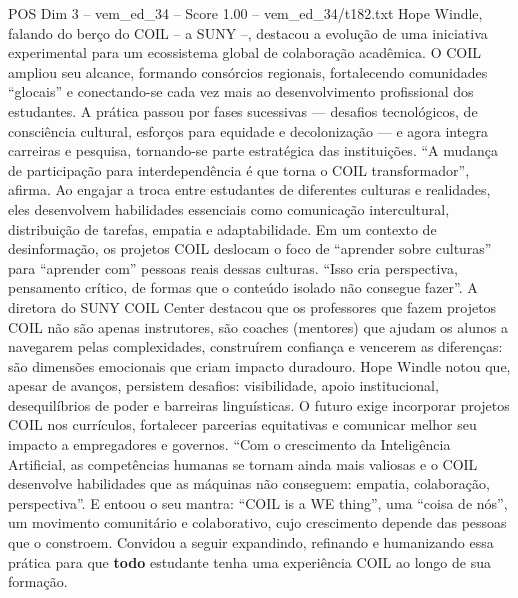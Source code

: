 \begin{textsample}{POS Dim 3 – vem\_ed\_34 – Score 1.00 – vem\_ed\_34/t182.txt}
Hope Windle, falando do berço do COIL – a SUNY –, destacou a evolução de uma iniciativa experimental para um ecossistema global de colaboração acadêmica.
O COIL ampliou seu alcance, formando consórcios regionais, fortalecendo comunidades “glocais” e conectando-se cada vez mais ao desenvolvimento profissional dos estudantes.
A prática passou por fases sucessivas — desafios tecnológicos, de consciência cultural, esforços para equidade e decolonização — e agora integra carreiras e pesquisa, tornando-se parte estratégica das instituições. “A mudança de participação para interdependência é que torna o COIL transformador”, afirma.
Ao engajar a troca entre estudantes de diferentes culturas e realidades, eles desenvolvem habilidades essenciais como comunicação intercultural, distribuição de tarefas, empatia e adaptabilidade.
Em um contexto de desinformação, os projetos COIL deslocam o foco de “aprender sobre culturas” para “aprender com” pessoas reais dessas culturas. “Isso cria perspectiva, pensamento crítico, de formas que o conteúdo isolado não consegue fazer”.
A diretora do SUNY COIL Center destacou que os professores que fazem projetos COIL não são apenas instrutores, são coaches (mentores) que ajudam os alunos a navegarem pelas complexidades, construírem confiança e vencerem as diferenças: são dimensões emocionais que criam impacto duradouro.
Hope Windle notou que, apesar de avanços, persistem desafios: visibilidade, apoio institucional, desequilíbrios de poder e barreiras linguísticas.
O futuro exige incorporar projetos COIL nos currículos, fortalecer parcerias equitativas e comunicar melhor seu impacto a empregadores e governos. “Com o crescimento da Inteligência Artificial, as competências humanas se tornam ainda mais valiosas e o COIL desenvolve habilidades que as máquinas não conseguem: empatia, colaboração, perspectiva”.
E entoou o seu mantra: “COIL is a WE thing”, uma “coisa de nós”, um movimento comunitário e colaborativo, cujo crescimento depende das pessoas que o constroem.
Convidou a seguir expandindo, refinando e humanizando essa prática para que \textbf{todo} estudante tenha uma experiência COIL ao longo de sua formação.

\end{textsample}
